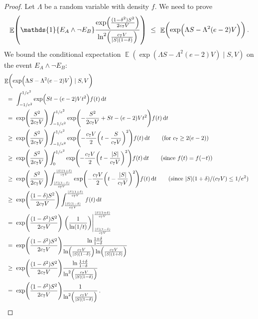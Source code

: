 \documentclass[11pt]{article}
\DeclareMathOperator{\E}{\mathbb{E}}
\theoremstyle{remark}
\theoremstyle{definition}
\newcommand\parens[1]{(#1)}
\newcommand\ind[1]{\ensuremath{\mathds{1}\{#1\}}}
\newcommand\Parens[1]{\mleft(#1\mright)}
\begin{document}
\begin{proof}
  Let $\Lambda$ be a random variable with density $f$.
  We need to prove
  \[
    \E\Parens{
      \ind{E_A \wedge \neg E_B}
      \frac{
        \exp\Parens{\frac{(1-\delta^2)S^2}{2c_7V}}
      }{
        \ln^2\Parens{\frac{c_7V}{|S|(1-\delta)}}
      }
    }
    \ \leq \
    \E\Parens{
      \exp\Parens{ \Lambda S - \Lambda^2 (e-2) V }
    }
    \,.
  \]
  We bound the conditional expectation $\E\parens{ \exp\parens{
  \Lambda S - \Lambda^2 (e-2) V } \mid S,V}$ on the event $E_A \wedge
  \neg E_B$:
  \begin{align*}
    \lefteqn{
      \E\Parens{
        \exp\Parens{ \Lambda S - \Lambda^2 (e-2) V }
        \mid S,V
      }
    } \\
    & \ = \
    \int_{-1/e^2}^{1/e^2}
    \exp\Parens{ S t - (e-2) V t^2 }
    f(t) \dif{t}
    \\
    & \ = \
    \exp\Parens{\frac{S^2}{2c_7V}}
    \int_{-1/e^2}^{1/e^2}
    \exp\Parens{
      -\frac{S^2}{2c_7V}
      + S t - (e-2) V t^2
    }
    f(t) \dif{t}
    \\
    & \ \geq \
    \exp\Parens{\frac{S^2}{2c_7V}}
    \int_{-1/e^2}^{1/e^2}
    \exp\Parens{
      -\frac{c_7V}{2}
      \Parens{ t - \frac{S}{c_7V} }^2
    }
    f(t) \dif{t}
    \qquad \text{(for $c_7 \geq 2(e-2)$)}
    \\
    & \ \geq \
    \exp\Parens{\frac{S^2}{2c_7V}}
    \int_0^{1/e^2}
    \exp\Parens{
      -\frac{c_7V}{2}
      \Parens{ t - \frac{|S|}{c_7V} }^2
    }
    f(t) \dif{t}
    \qquad \text{(since $f(t) = f(-t)$)}
    \\
    & \ \geq \
    \exp\Parens{\frac{S^2}{2c_7V}}
    \int_{\frac{|S|(1-\delta)}{c_7V}}^{\frac{|S|(1+\delta)}{c_7V}}
    \exp\Parens{
      -\frac{c_7V}{2}
      \Parens{ t - \frac{|S|}{c_7V} }^2
    }
    f(t) \dif{t}
    \qquad \text{(since $|S|(1+\delta)/(c_7V) \leq 1/e^2$)}
    \\
    & \ \geq \
    \exp\Parens{\frac{(1-\delta)S^2}{2c_7V}}
    \int_{\frac{|S|(1-\delta)}{c_7V}}^{\frac{|S|(1+\delta)}{c_7V}}
    f(t) \dif{t}
    \\
    & \ = \
    \exp\Parens{\frac{(1-\delta^2)S^2}{2c_7V}}
    \left.
    \Parens{
      \frac{1}{\ln(1/t)}
    }
    \right\vert_{\frac{|S|(1-\delta)}{c_7V}}^{\frac{|S|(1+\delta)}{c_7V}}
    \\
    & \ = \
    \exp\Parens{\frac{(1-\delta^2)S^2}{2c_7V}}
    \frac{\ln\frac{1+\delta}{1-\delta}}
    {\ln\Parens{\frac{c_7V}{|S|(1-\delta)}}\ln\Parens{\frac{c_7V}{|S|(1+\delta)}}}
    \\
    & \ \geq \
    \exp\Parens{\frac{(1-\delta^2)S^2}{2c_7V}}
    \frac{\ln\frac{1+\delta}{1-\delta}}
    {\ln^2\Parens{\frac{c_7V}{|S|(1-\delta)}}}
    \\
    & \ = \
    \exp\Parens{\frac{(1-\delta^2)S^2}{2c_7V}}
    \frac{1}{\ln^2\Parens{\frac{c_7V}{|S|(1-\delta)}}}
    \,.
    \qedhere
  \end{align*}
\end{proof}
\end{document}
